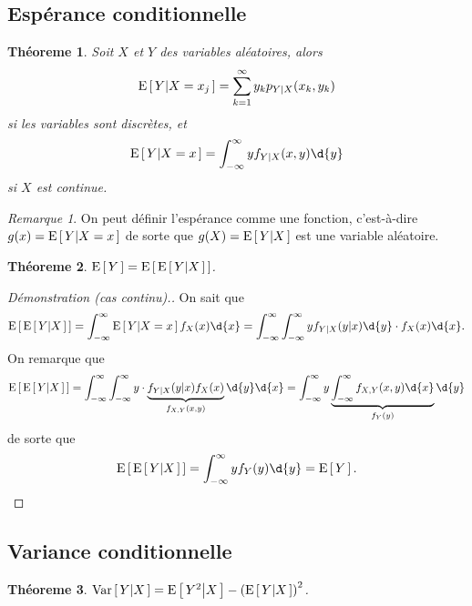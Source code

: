 \documentclass[11pt]{article}
\newcommand\Esp[1]{%
	\ensuremath{%
		\mathrm{E}\left[\,#1\,\right]%
	}%
}%
\newcommand\Espg[2]{%
	\ensuremath{%
		\mathrm{E}\left[\,#1\middle\vert#2\,\right]%
	}%
}%
\newcommand\Varg[2]{%
	\ensuremath{%
		\mathrm{Var}\left[\,#1\middle\vert#2\,\right]%
	}%
}%
\newtheorem{theoreme}{Théoreme}[section]
\theoremstyle{remark}
\newtheorem*{remark}{Remarque}
\theoremstyle{definition}
\begin{document}
\subsection{Espérance conditionnelle}
\begin{theoreme}
	Soit $X$ et $Y$ des variables aléatoires, alors
	\begin{equation*}
		\Espg{Y}{X=x_j}=\sum_{k=1}^\infty y_kp_{Y|X}(x_k,y_k)
	\end{equation*}
	si les variables sont discrètes, et
	\begin{equation*}
		\Espg{Y}{X=x}=\int_{-\infty}^\infty yf_{Y|X}(x,y)\d{y}
	\end{equation*}
	si $X$ est continue.
\end{theoreme}

\begin{remark}
	On peut définir l'espérance comme une fonction, c'est-à-dire $g(x)=
	\Espg{Y}{X=x}$ de sorte que $g(X)=\Espg{Y}{X}$ est une variable aléatoire.
\end{remark}

\begin{theoreme}\label{th:esp_cond}
	$\Esp{Y}=\Esp{\Espg{Y}{X}}$.
\end{theoreme}

\begin{proof}[Démonstration (cas continu).]
	On sait que
	\begin{equation*}
		\Esp{\Espg{Y}{X}}
		=\int_{-\infty}^\infty\Espg{Y}{X=x}f_X(x)\d{x}
		=\int_{-\infty}^\infty\int_{-\infty}^\infty
         yf_{Y|X}(y|x)\d{y}\cdot f_X(x)\d{x}.
	\end{equation*}
	On remarque que
	\begin{equation*}
		\Esp{\Espg{Y}{X}}
		=\int_{-\infty}^\infty\int_{-\infty}^\infty
		 y\cdot\underbrace{f_{Y|X}(y|x)f_X(x)}_{f_{X,Y}(x,y)}\d{y}\d{x}
		=\int_{-\infty}^\infty y\underbrace{\int_{-\infty}^\infty
         f_{X,Y}(x,y)\d{x}}_{f_Y(y)}\d{y}
	\end{equation*}
	de sorte que
	\begin{equation*}
		\Esp{\Espg{Y}{X}}
		=\int_{-\infty}^\infty yf_Y(y)\d{y}
		=\Esp{Y}.\qedhere
	\end{equation*}
\end{proof}

\subsection{Variance conditionnelle}
\begin{theoreme}
	$\Varg{Y}{X}=\Espg{Y^2}{X}-\left(\Espg{Y}{X}\right)^2$.
\end{theoreme}
\end{document}
